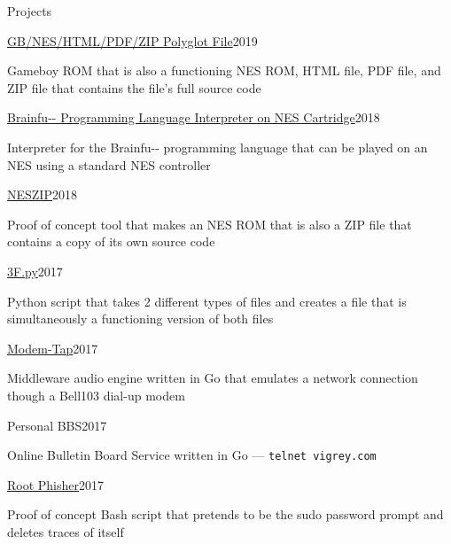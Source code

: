 \documentclass{resume} %
\begin{document}
\begin{rSection}{Projects}


\begin{rSubsection}{\href{https://github.com/ViGrey/gb-nes-html-pdf-zip}{GB/NES/HTML/PDF/ZIP Polyglot File}}{2019}{}{}
\item Gameboy ROM that is also a functioning NES ROM, HTML file, PDF file, and ZIP file that contains the file's full source code
\end{rSubsection}

\begin{rSubsection}{\href{https://github.com/ViGrey/brainfu}{Brainfu-{}- Programming Language Interpreter on NES Cartridge}}{2018}{}{}
\item Interpreter for the Brainfu-{}- programming language that can be played on an NES using a standard NES controller
\end{rSubsection}

\begin{rSubsection}{\href{https://github.com/ViGrey/neszip-example}{NESZIP}}{2018}{}{}
\item Proof of concept tool that makes an NES ROM that is also a ZIP file that contains a copy of its own source code
\end{rSubsection}


\begin{rSubsection}{\href{https://github.com/ViGrey/3f.py}{3F.py}}{2017}{}{}
\item Python script that takes 2 different types of files and creates a file that is simultaneously a functioning version of both files
\end{rSubsection}

\begin{rSubsection}{\href{https://github.com/ViGrey/modem-tap}{Modem-Tap}}{2017}{}{}
\item Middleware audio engine written in Go that emulates a network connection though a Bell103 dial-up modem
\end{rSubsection}

\begin{rSubsection}{Personal BBS}{2017}{}{}
\item Online Bulletin Board Service written in Go --- \texttt{telnet vigrey.com}
\end{rSubsection}


\begin{rSubsection}{\href{https://gist.github.com/ViGrey/213cfd61668c08c09b76fdc30781ac64}{Root Phisher}}{2017}{}{}
\item Proof of concept Bash script that pretends to be the sudo password prompt and deletes traces of itself
\end{rSubsection}


\end{rSection}
\end{document}
